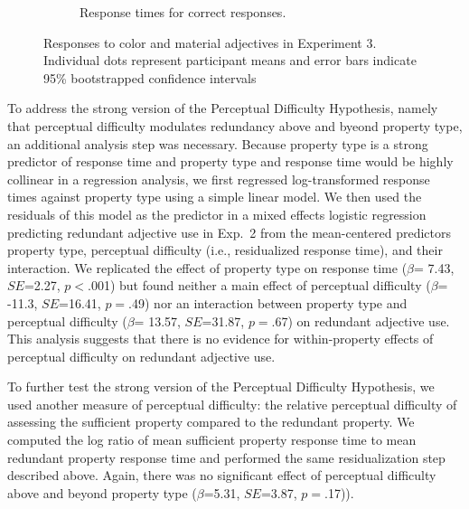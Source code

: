 \documentclass[12pt,letterpaper]{article}
\begin{document}
\begin{figure}[ht]
\begin{subfigure}{.4 \textwidth}
   \caption{Response times for correct responses.}
   \label{fig:exp3_b}
   \end{subfigure}
   \caption{Responses to color and material adjectives in Experiment 3. Individual dots represent participant means and error bars indicate 95\% bootstrapped confidence intervals}
   \label{fig:exp3}
\end{figure}   

To address the strong version of the Perceptual Difficulty Hypothesis, namely that perceptual difficulty modulates redundancy above and byeond property type, an additional analysis step was necessary. Because property type is a strong predictor of response time and property type and response time would be highly collinear in a regression analysis, we first regressed log-transformed response times against property type using a simple linear model. %
We then used the residuals of this model as the predictor in a mixed effects logistic regression predicting redundant adjective use in Exp.~2 from the mean-centered predictors  property type, perceptual difficulty (i.e., residualized response time), and their interaction. We replicated the effect of property type on response time ($\beta$= 7.43, $SE$=2.27, $p$$<$.001) but found neither a main effect of perceptual difficulty ($\beta$= -11.3, $SE$=16.41, $p$$=$.49) nor an interaction between property type and perceptual difficulty ($\beta$= 13.57, $SE$=31.87, $p$$=$.67) on redundant adjective use. This analysis suggests that there is no evidence for within-property effects of perceptual difficulty on redundant adjective use.

To further test the strong version of the Perceptual Difficulty Hypothesis, we used another measure of perceptual difficulty: the relative perceptual difficulty of assessing the sufficient property compared to the redundant property. We computed the log ratio of mean sufficient property response time to   mean redundant property response time and performed the same residualization step described above. Again, there was no significant effect of perceptual difficulty above and beyond property type ($\beta$=5.31, $SE$=3.87, $p$$=$.17)).
\end{document}
